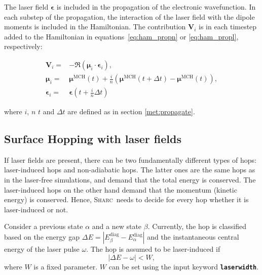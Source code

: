 \documentclass[a4paper,11pt,DIV=15,openany,twoside=false]{scrbook}
\newcommand{\ttmdump}[1]{#1}
\newcommand{\sharc}{\textsc{Sharc}}
\newcommand{\ttt}[1]{\textbf{\texttt{#1}}}
\newcommand{\VEC}[1]{\ensuremath{\mathbf{#1}}}
\begin{document}
The laser field $\boldsymbol{\epsilon}$ is included in the propagation of the electronic wavefunction. In each substep of the propagation, the interaction of the laser field with the dipole moments is included in the Hamiltonian. The contribution $\VEC{V}_i$ is in each timestep added to the Hamiltonian in equations~\eqref{eq:ham_propn} or \eqref{eq:ham_propl}, respectively:
\ttmdump{
  \begin{align}
    \VEC{V}_i=&
    -
    \Re\left(
      \boldsymbol{\mu}_i\cdot
      \boldsymbol{\epsilon}_i
    \right),\\
    \boldsymbol{\mu}_i=&
    \boldsymbol{\mu}^{\text{MCH}}(t) + \frac{i}{n}
    \left(
      \boldsymbol{\mu}^{\text{MCH}}(t+\Delta t)-\boldsymbol{\mu}^{\text{MCH}}(t)
    \right),\\
    \boldsymbol{\epsilon}_i=&\boldsymbol{\epsilon}\left(t+\frac{i}{n}\Delta t\right)
  \end{align}
}
where $i$, $n$ $t$ and $\Delta t$ are defined as in section \ref{met:propagate}.

\subsection{Surface Hopping with laser fields}

If laser fields are present, there can be two fundamentally different types of hops: laser-induced hops and non-adiabatic hops. The latter ones are the same hops as in the laser-free simulations, and demand that the total energy is conserved. The laser-induced hops on the other hand demand that the momentum (kinetic energy) is conserved. Hence, \sharc\ needs to decide for every hop whether it is laser-induced or not. 

Consider a previous state $\alpha$ and a new state $\beta$. Currently, the hop is classified based on the energy gap $\Delta E=|E_\beta^\text{diag}-E_\alpha^\text{diag}|$ and the instantaneous central energy of the laser pulse $\omega$. 
The hop is assumed to be laser-induced if
\begin{equation}
  |\Delta E-\omega| < W,
\end{equation}
where $W$ is a fixed parameter. $W$ can be set using the input keyword \ttt{laserwidth}.
\end{document}
